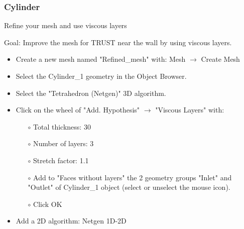 \documentclass[10pt]{beamer}
\begin{document}
\begin{frame}
\frametitle{Cylinder}
\begin{block}{Refine your mesh and use viscous layers}

Goal: Improve the mesh for TRUST near the wall by using viscous layers.

\begin{itemize}
\item Create a new mesh named "Refined\_mesh" with: Mesh $\rightarrow$ Create Mesh

\item Select the Cylinder\_1 geometry in the Object Browser.

\item Select the "Tetrahedron (Netgen)" 3D algorithm.

\item Click on the wheel of "Add. Hypothesis" $\rightarrow$ "Viscous Layers" with:
    \begin{itemize}
    \item [$\circ$] Total thickness: 30
    \item [$\circ$] Number of layers: 3
    \item [$\circ$] Stretch factor: 1.1
    \item [$\circ$] Add to "Faces without layers" the 2 geometry groups "Inlet" and "Outlet" of Cylinder\_1 object (select or unselect the mouse icon).
    \item [$\circ$] Click OK
    \end{itemize}

\item Add a 2D algorithm: Netgen 1D-2D
\end{itemize}

\end{block}
\end{frame}
\end{document}
